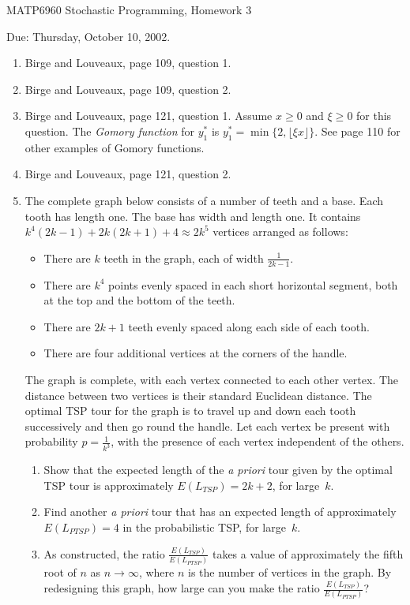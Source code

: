\documentclass[12pt]{article}
\begin{document}
\begin{center}
  \begin{large}
     MATP6960 Stochastic Programming, Homework 3
  \end{large}
\end{center}

\begin{flushright}
   Due:  Thursday, October 10, 2002.
\end{flushright}



\begin{enumerate}
\item Birge and Louveaux, page 109, question 1.
\item Birge and Louveaux, page 109, question 2.
\item Birge and Louveaux, page 121, question 1.
Assume $x \geq 0$ and $\xi \geq 0$ for this question.
The {\em Gomory function} for $y_1^*$ is
$y_1^*=\min\{2,\lfloor \xi x \rfloor \}$.
See page 110 for other examples of Gomory functions.
\item Birge and Louveaux, page 121, question 2.
\item %
The complete graph below consists of a number of teeth and a base.
Each tooth has length one.
The base has width and length one.
It contains $k^4(2k-1)+2k(2k+1)+4 \approx 2k^5$ vertices arranged as follows:
\begin{itemize}
\item
There are $k$ teeth in the graph, each of width $\frac{1}{2k-1}$.
\item
There are $k^4$ points evenly spaced in each
short horizontal segment, both at the top and the bottom of the teeth.
\item
There are $2k+1$ teeth evenly spaced along each side of each tooth.
\item
There are four additional vertices at the corners of the handle.
\end{itemize}
The graph is complete, with each vertex connected to each other vertex.
The distance between two vertices is their standard Euclidean distance.
The optimal TSP tour for the graph is to travel up and down each tooth
successively and then go round the handle.
Let each vertex be present with probability $p=\frac{1}{k^3}$,
with the presence of each vertex independent of the others.
\begin{enumerate}
\item
Show that the expected length of the {\em a priori} tour given
by the optimal TSP tour is approximately $E(L_{TSP})=2k+2$, for large~$k$.
\item
Find another {\em a priori} tour that has an expected length of
approximately $E(L_{PTSP})=4$ in the probabilistic TSP, for large~$k$.
\item
As constructed, the ratio
$\frac{E(L_{TSP})}{E(L_{PTSP})}$
takes a value of approximately the fifth root of $n$ as $n\rightarrow\infty$,
where $n$ is the number of vertices in the graph.
By redesigning this graph, how large can you make the ratio
$\frac{E(L_{TSP})}{E(L_{PTSP})}$?
\end{enumerate}


\end{enumerate}
\end{document}

